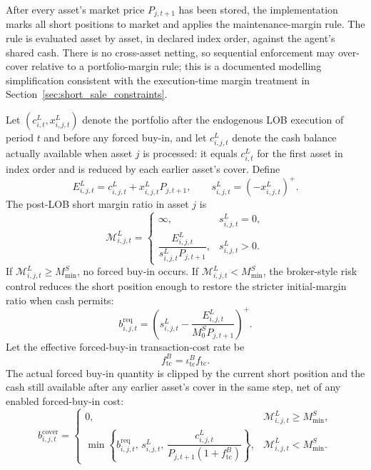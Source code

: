 \documentclass[12pt, a4paper]{article}
\newcommand{\pospart}[1]{\left(#1\right)^{+}}
\begin{document}
    After every asset's market price \(P_{j,t+1}\) has been stored, the
    implementation marks all short positions to market and applies the
    maintenance-margin rule. The rule is evaluated asset by asset, in declared
    index order, against the agent's shared cash. There is no cross-asset netting,
    so sequential enforcement may over-cover relative to a portfolio-margin rule;
    this is a documented modelling simplification consistent with the
    execution-time margin treatment in Section~\ref{sec:short_sale_constraints}.

    Let \((c_{i,t}^{L},x_{i,j,t}^{L})\) denote the portfolio after the endogenous
    LOB execution of period \(t\) and before any forced buy-in, and let
    \(c_{i,j,t}^{L}\) denote the cash balance actually available when asset \(j\)
    is processed: it equals \(c_{i,t}^{L}\) for the first asset in index order and
    is reduced by each earlier asset's cover. Define
    \[
        E_{i,j,t}^{L}=c_{i,j,t}^{L}+x_{i,j,t}^{L}P_{j,t+1},
        \qquad
        s_{i,j,t}^{L}=\pospart{-x_{i,j,t}^{L}}.
    \]
    The post-LOB short margin ratio in asset \(j\) is
    \[
        \mathcal{M}_{i,j,t}^{L}=
        \begin{cases}
            \infty, & s_{i,j,t}^{L}=0,\\[1ex]
            \dfrac{E_{i,j,t}^{L}}{s_{i,j,t}^{L}P_{j,t+1}}, & s_{i,j,t}^{L}>0.
        \end{cases}
    \]
    If \(\mathcal{M}_{i,j,t}^{L}\ge M_{\min}^{S}\), no forced buy-in occurs. If
    \(\mathcal{M}_{i,j,t}^{L}<M_{\min}^{S}\), the broker-style risk control reduces
    the short position enough to restore the stricter initial-margin ratio when
    cash permits:
    \[
        b_{i,j,t}^{\mathrm{req}}
        =
        \pospart{
            s_{i,j,t}^{L}
            -
            \frac{E_{i,j,t}^{L}}{M_0^{S}P_{j,t+1}}
        }.
    \]
    Let the effective forced-buy-in transaction-cost rate be
    \[
        f_{\mathrm{tc}}^{B}=\iota_{\mathrm{tc}}^B f_{\mathrm{tc}}.
    \]
    The actual forced buy-in quantity is clipped by the current short position and
    the cash still available after any earlier asset's cover in the same step,
    net of any enabled forced-buy-in cost:
    \[
        b_{i,j,t}^{\text{cover}}
        =
        \begin{cases}
            0, & \mathcal{M}_{i,j,t}^{L}\ge M_{\min}^{S},\\[1ex]
            \min\left\{
                    b_{i,j,t}^{\mathrm{req}},\,
                    s_{i,j,t}^{L},\,
                    \dfrac{c_{i,j,t}^{L}}{P_{j,t+1}(1+f_{\mathrm{tc}}^{B})}
            \right\}, & \mathcal{M}_{i,j,t}^{L}<M_{\min}^{S}.
        \end{cases}
    \]
\end{document}
